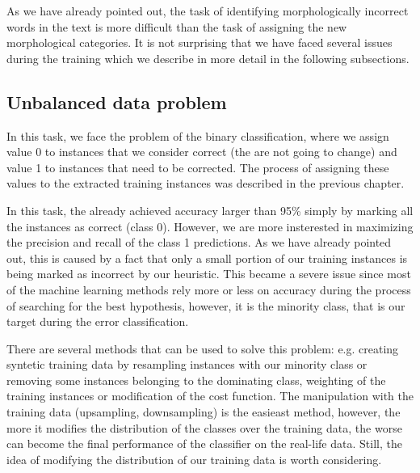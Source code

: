 
As we have already pointed out, 
the task of identifying morphologically incorrect words in the text is more difficult
than the task of assigning the new morphological categories. It is not surprising
that we have faced several issues
during the training which we describe in more detail in the following subsections.



\subsection{Unbalanced data problem}

In this task, we face the problem of the binary classification, where we
assign value 0 to instances that we consider correct (the are not going to change) and value 1 to
instances that need to be corrected. The process of assigning these values to the
extracted training instances was described in the previous chapter. 

In this task, the  already achieved accuracy larger than 95\%
simply by marking all the instances as correct (class 0). However, we are more insterested
in maximizing the precision and recall of the class 1 predictions.
As we have already pointed out, this is caused by a fact that only a small portion of our
training instances is being marked as incorrect by our heuristic.
This became a severe issue since most of the machine learning methods rely more or less on accuracy during
the process of searching for the best hypothesis, however, it is the minority
class, that is our target during the error classification.

There are several methods that can be used to solve this problem: e.g. creating syntetic
training data by resampling instances with our minority class or removing some instances
belonging to the dominating class, weighting of the training instances or modification of the
cost function. The manipulation with the training data (upsampling, downsampling) is the easieast method,
however, the more it modifies the distribution of the classes over the training data, the worse can become the final
performance of the classifier on the real-life data. Still, the idea of modifying the distribution
of our training data is worth considering.

